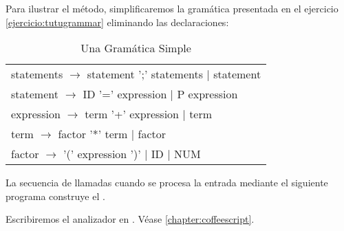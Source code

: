
Para ilustrar el método,
simplificaremos la gramática presentada en el ejercicio
\ref{ejercicio:tutugrammar} eliminando las declaraciones:


\begin{table}
\begin{center}
\vspace{0.25cm}
\begin{tabular}{|l|}
statements   $\rightarrow$ statement  ';'  statements        $|$ statement\\
statement    $\rightarrow$ ID '=' expression                 $|$ P  expression\\
expression   $\rightarrow$ term '+' expression               $|$ term\\
term         $\rightarrow$ factor '*' term                   $|$ factor\\
factor       $\rightarrow$ '(' expression ')' $|$ ID $|$ NUM
\end{tabular}
\end{center}
\label{table:gramaticasimple}
\caption{Una Gramática Simple}
\end{table}
\vspace{0.25cm}

La secuencia de llamadas cuando se procesa la entrada mediante 
el siguiente programa construye  el .

Escribiremos el analizador en 
.
Véase 
\ref{chapter:coffeescript}.

